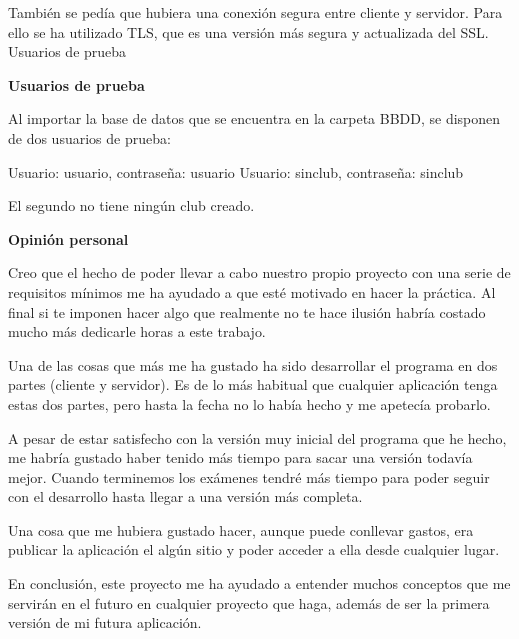 También se pedía que hubiera una conexión segura entre cliente y servidor. Para ello se ha utilizado T\+LS, que es una versión más segura y actualizada del S\+SL. Usuarios de prueba

{\bfseries Usuarios de prueba}

Al importar la base de datos que se encuentra en la carpeta B\+B\+DD, se disponen de dos usuarios de prueba\+:

Usuario\+: usuario, contraseña\+: usuario Usuario\+: sinclub, contraseña\+: sinclub

El segundo no tiene ningún club creado.

{\bfseries Opinión personal}

Creo que el hecho de poder llevar a cabo nuestro propio proyecto con una serie de requisitos mínimos me ha ayudado a que esté motivado en hacer la práctica. Al final si te imponen hacer algo que realmente no te hace ilusión habría costado mucho más dedicarle horas a este trabajo.

Una de las cosas que más me ha gustado ha sido desarrollar el programa en dos partes (cliente y servidor). Es de lo más habitual que cualquier aplicación tenga estas dos partes, pero hasta la fecha no lo había hecho y me apetecía probarlo.

A pesar de estar satisfecho con la versión muy inicial del programa que he hecho, me habría gustado haber tenido más tiempo para sacar una versión todavía mejor. Cuando terminemos los exámenes tendré más tiempo para poder seguir con el desarrollo hasta llegar a una versión más completa.

Una cosa que me hubiera gustado hacer, aunque puede conllevar gastos, era publicar la aplicación el algún sitio y poder acceder a ella desde cualquier lugar.

En conclusión, este proyecto me ha ayudado a entender muchos conceptos que me servirán en el futuro en cualquier proyecto que haga, además de ser la primera versión de mi futura aplicación.



 